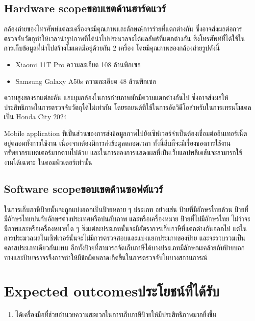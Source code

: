 \subsection{\ifenglish Hardware scope\else ขอบเขตด้านฮาร์ดแวร์\fi}

กล้องถ่ายของโทรศัพท์แต่ละเครื่องจะมีคุณภาพและลักษณ์การร่ายที่แตกต่างกัน 
ซึ่งอาจส่งผลต่อการตรวจจับวัตถุทำให้เวลานำรูปภาพที่ได้นำไปประมวลจะได้ผลลัพธ์ที่แตกต่างกัน 
ซึ่งโทรศัพท์ที่ได้ใช้ในการเก็บข้อมูลที่นำไปสร้างโมเดลมีอยู่ด้วยกัน 2 เครื่อง โดยมีคุณภาพของกล้องถ่ายรูปดังนี้
\begin{itemize}
    \item Xiaomi 11T Pro ความละเอียด 108 ล้านพิกเซล 
    \item Samsung Galaxy A50s ความละเอียด 48 ล้านพิกเซล 
\end{itemize}

ความสูงของรถแต่ละคัน และมุมกล้องในการถ่ายภาพมักมีความแตกต่างกันไป ซึ่งอาจส่งผลให้ประสิทธิภาพในการตรวจจับวัตถุได้ไม่เท่ากัน 
โดยรถยนต์ที่ใช้ในการอัดวิดีโอสำหรับในการเทรนโมเดลเป็น Honda City 2024 

Mobile application ที่เป็นส่วนของการส่งข้อมูลภาพไปยังเซิฟเวอร์จำเป็นต้องเชื่อมต่ออินเทอร์เน็ตอยู่ตลอดทั้งการใช้งาน เนื่องจากต้องมีการส่งข้อมูลตลอดเวลา 
ทั้งนี้สืบก็จะมีเรื่องของการใช้งานทรัพยากรแบตเตอร์มากตามไปด้วย และในการของการแสดงผลที่เป็นเว็บแอปพลิเคชันจะสามารถใช้งานได้เฉพาะ
ในคอมพิวเตอร์เท่านั้น 

\subsection{\ifenglish Software scope\else ขอบเขตด้านซอฟต์แวร์\fi}

ในการเก็บภาษีป้ายนั้นจะถูกแบ่งออกเป็นป้ายหลาย ๆ ประเภท อย่างเช่น ป้ายที่มีอักษรไทยล้วน ป้ายที่มีอักษรไทยปนกับอักษรต่างประเทศหรือปนกับภาพ 
และหรือเครื่องหมาย ป้ายที่ไม่มีอักษรไทย ไม่ว่าจะมีภาพและหรือเครื่องหมายใด ๆ ซึ่งแต่ละประเภทนั้นจะมีอัตราการเก็บภาษีที่แตกต่างกันออกไป 
แต่ในการประมวลผลในเซิฟเวอร์นั้นจะไม่มีการตรวจสอบและแบ่งแยกประเภทของป้าย และจะรวบรวมเป็นคลาสประเภทเดียวกันแทน อีกทั้งป้ายที่สามารถจัดเก็บภาษีได้บางประเภทมีลักษณะคล้ายกับป้ายบอกทางและป้ายจราจรจึงอาจทำให้มีข้อผิดพลาดเกิดขึ้นในการตรวจจับในบางสถานการณ์

\section{\ifenglish Expected outcomes\else ประโยชน์ที่ได้รับ\fi}
\begin{enumerate}
    \item ได้เครื่องมือที่ช่วยอำนวยความสะดวกในการเก็บภาษีป้ายให้มีประสิทธิภาพมากยิ่งขึ้น
\end{enumerate}

